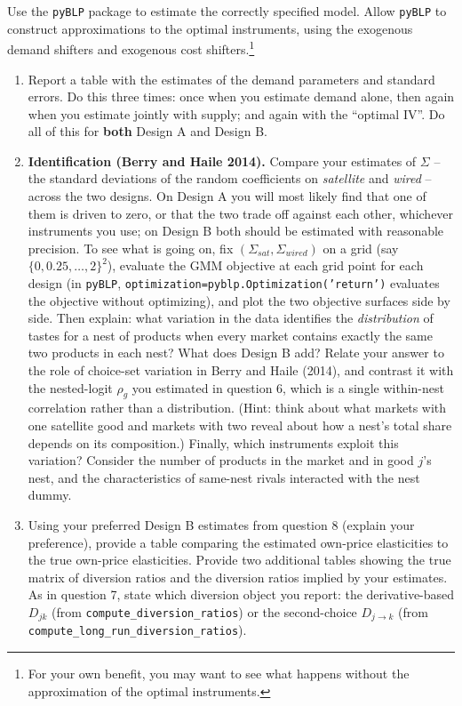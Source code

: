 \documentclass[english,11pt]{article}
\begin{document}
Use the \texttt{pyBLP} package to estimate the correctly specified model. Allow
\texttt{pyBLP} to construct approximations to the optimal instruments, using the
exogenous demand shifters and exogenous cost shifters.\footnote{%
For your own benefit, you may want to see what happens without the
approximation of the optimal instruments.} 

\begin{enumerate}
\item[8.] Report a table with the estimates of the demand
parameters and standard errors. Do this three times: once when you estimate demand
alone, then again when you estimate jointly with supply; and again with the ``optimal IV''.
Do all of this for \textbf{both} Design A and Design B.

\item[8a.] \textbf{Identification (Berry and Haile 2014).} Compare your
estimates of $\Sigma $ -- the standard deviations of the random coefficients
on \textit{satellite} and \textit{wired} -- across the two designs. On Design
A you will most likely find that one of them is driven to zero, or that the
two trade off against each other, whichever instruments you use; on Design B
both should be estimated with reasonable precision. To see what is going on,
fix $(\Sigma _{sat},\Sigma _{wired})$ on a grid (say $\{0,0.25,\ldots
,2\}^{2}$), evaluate the GMM objective at each grid point for each design
(in \texttt{pyBLP}, \texttt{optimization=pyblp.Optimization('return')}
evaluates the objective without optimizing), and plot the two objective
surfaces side by side. Then explain: what variation in the data identifies
the \textit{distribution} of tastes for a nest of products when every market
contains exactly the same two products in each nest? What does Design B add?
Relate your answer to the role of choice-set variation in Berry and Haile
(2014), and contrast it with the nested-logit $\rho _{g}$ you estimated in
question 6, which is a single within-nest correlation rather than a
distribution. (Hint: think about what markets with one satellite good and
markets with two reveal about how a nest's total share depends on its
composition.) Finally, which instruments exploit this variation? Consider the
number of products in the market and in good $j$'s nest, and the
characteristics of same-nest rivals interacted with the nest dummy.

\item[9.] Using your preferred Design B estimates from question 8 (explain your
preference), provide a table comparing the estimated own-price elasticities
to the true own-price elasticities. Provide two additional tables showing
the true matrix of diversion ratios and the diversion ratios implied by your
estimates. As in question 7, state which diversion object you report: the
derivative-based $D_{jk}$ (from \texttt{compute\_diversion\_ratios}) or the
second-choice $D_{j\rightarrow k}$ (from
\texttt{compute\_long\_run\_diversion\_ratios}).


\end{enumerate}
\end{document}
